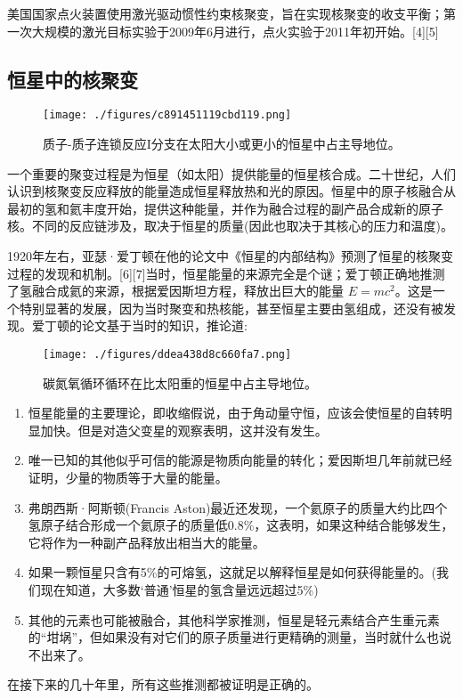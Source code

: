 美国国家点火装置使用激光驱动惯性约束核聚变，旨在实现核聚变的收支平衡；第一次大规模的激光目标实验于2009年6月进行，点火实验于2011年初开始。[4][5]

\subsection{恒星中的核聚变}
\begin{figure}[ht]
\centering
\texttt{[image: ./figures/c891451119cbd119.png]}
\caption{质子-质子连锁反应I分支在太阳大小或更小的恒星中占主导地位。} \label{fig_HJB_2}
\end{figure}
一个重要的聚变过程是为恒星（如太阳）提供能量的恒星核合成。二十世纪，人们认识到核聚变反应释放的能量造成恒星释放热和光的原因。恒星中的原子核融合从最初的氢和氦丰度开始，提供这种能量，并作为融合过程的副产品合成新的原子核。不同的反应链涉及，取决于恒星的质量(因此也取决于其核心的压力和温度)。

1920年左右，亚瑟·爱丁顿在他的论文中《恒星的内部结构》预测了恒星的核聚变过程的发现和机制。[6][7]当时，恒星能量的来源完全是个谜；爱丁顿正确地推测了氢融合成氦的来源，根据爱因斯坦方程，释放出巨大的能量 $E = mc^2$。这是一个特别显著的发展，因为当时聚变和热核能，甚至恒星主要由氢组成，还没有被发现。爱丁顿的论文基于当时的知识，推论道:
\begin{figure}[ht]
\centering
\texttt{[image: ./figures/ddea438d8c660fa7.png]}
\caption{碳氮氧循环循环在比太阳重的恒星中占主导地位。} \label{fig_HJB_3}
\end{figure}
\begin{enumerate}
\item 恒星能量的主要理论，即收缩假说，由于角动量守恒，应该会使恒星的自转明显加快。但是对造父变星的观察表明，这并没有发生。
\item 唯一已知的其他似乎可信的能源是物质向能量的转化；爱因斯坦几年前就已经证明，少量的物质等于大量的能量。
\item 弗朗西斯·阿斯顿(Francis Aston)最近还发现，一个氦原子的质量大约比四个氢原子结合形成一个氦原子的质量低0.8\%，这表明，如果这种结合能够发生，它将作为一种副产品释放出相当大的能量。
\item 如果一颗恒星只含有5\%的可熔氢，这就足以解释恒星是如何获得能量的。(我们现在知道，大多数‘普通’恒星的氢含量远远超过5\%)
\item 其他的元素也可能被融合，其他科学家推测，恒星是轻元素结合产生重元素的“坩埚”，但如果没有对它们的原子质量进行更精确的测量，当时就什么也说不出来了。
\end{enumerate}
在接下来的几十年里，所有这些推测都被证明是正确的。


